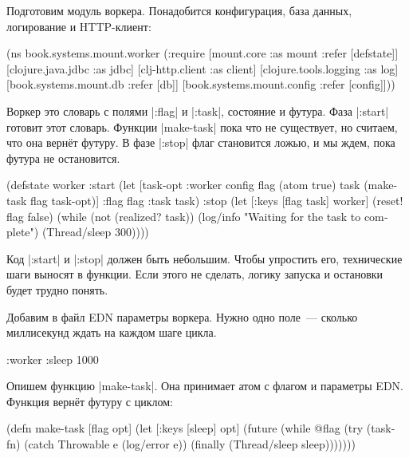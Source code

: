 Подготовим модуль воркера. Понадобится конфигурация, база данных, логирование и
HTTP-клиент:

\begin{english}
  \begin{clojure}
(ns book.systems.mount.worker
  (:require
   [mount.core :as mount :refer [defstate]]
   [clojure.java.jdbc :as jdbc]
   [clj-http.client :as client]
   [clojure.tools.logging :as log]
   [book.systems.mount.db :refer [db]]
   [book.systems.mount.config :refer [config]]))
  \end{clojure}
\end{english}

Воркер это словарь с полями \spverb|:flag| и \spverb|:task|, состояние и
футура. Фаза \spverb|:start| готовит этот словарь. Функции \spverb|make-task|
пока что не существует, но считаем, что она верн\"{е}т футуру. В фазе \spverb|:stop|
флаг становится ложью, и мы ждем, пока футура не остановится.

\begin{english}
  \begin{clojure}
(defstate worker
  :start
  (let [{task-opt :worker} config
        flag (atom true)
        task (make-task flag task-opt)]
    {:flag flag :task task})
  :stop
  (let [{:keys [flag task]} worker]
    (reset! flag false)
    (while (not (realized? task))
      (log/info "Waiting for the task to complete")
      (Thread/sleep 300))))
  \end{clojure}
\end{english}

Код \spverb|:start| и \spverb|:stop| должен быть небольшим. Чтобы упростить его,
технические шаги выносят в функции. Если этого не сделать, логику запуска и
остановки будет трудно понять.

Добавим в файл EDN параметры воркера. Нужно одно поле~--- сколько миллисекунд
ждать на каждом шаге цикла.

\begin{english}
  \begin{clojure}
{:worker {:sleep 1000}}
  \end{clojure}
\end{english}

Опишем функцию \spverb|make-task|. Она принимает атом с флагом и параметры
EDN. Функция верн\"{е}т футуру с циклом:

\begin{english}
  \begin{clojure}
(defn make-task
  [flag opt]
  (let [{:keys [sleep]} opt]
    (future
      (while @flag
        (try
          (task-fn)
          (catch Throwable e
            (log/error e))
          (finally
            (Thread/sleep sleep)))))))
  \end{clojure}
\end{english}

